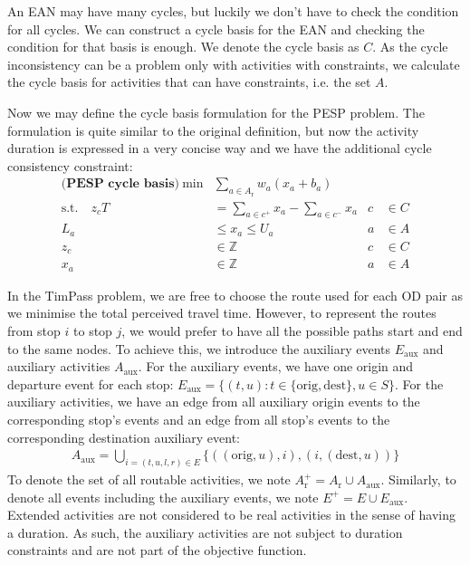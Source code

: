 \documentclass[english, 12pt, a4paper, sci, utf8, a-2b, online]{aaltothesis}
\newcommand{\Z}{\mathbb{Z}}
\newcommand{\Eaux}{E_\text{aux}}
\newcommand{\Ep}{E^+}
\newcommand{\Aaux}{A_\text{aux}}
\newcommand{\Ar}{A_\text{r}}
\newcommand{\Arp}{A_\text{r}^+}
\begin{document}
An EAN may have many cycles, but luckily we don't have to check the condition for all cycles. We can construct a cycle basis for the EAN and checking the condition for that basis is enough. We denote the cycle basis as $C$. As the cycle inconsistency can be a problem only with activities with constraints, we calculate the cycle basis for activities that can have constraints, i.e. the set $A$.



Now we may define the cycle basis formulation for the PESP problem. The formulation is quite similar to the original definition, but now the activity duration is expressed in a very concise way and we have the additional cycle consistency constraint:
\begin{align}
    \textbf{(PESP cycle basis)}\ \min &  \sum_{a \in \Ar} w_{a} (x_a + b_a) \\
    \textrm{s.t.} \quad  z_c T &= \sum_{a\in c^+} x_a - \sum_{a\in c^-} x_a &c &\in C \\
    L_a &\leq x_a  \leq U_a &a &\in A \\
    z_c &\in \Z &c& \in C \\
    x_a &\in \Z &a& \in A
\end{align}

In the TimPass problem, we are free to choose the route used for each OD pair as we minimise the total perceived travel time. However, to represent the routes from stop $i$ to stop $j$, we would prefer to have all the possible paths start and end to the same nodes. To achieve this, we introduce the auxiliary events $\Eaux$ and auxiliary activities $\Aaux$. For the auxiliary events, we have one origin and departure event for each stop: $\Eaux = \{(t, u) : t \in \{\text{orig}, \text{dest}\}, u \in S\}$. For the auxiliary activities, we have an edge from all auxiliary origin events to the corresponding stop's events and an edge from all stop's events to the corresponding destination auxiliary event:
\begin{align}
    \Aaux = \bigcup_{i = (t, u, l, r) \in E}\{((\text{orig}, u), i), (i, (\text{dest}, u))\}
\end{align}
To denote the set of all routable activities, we note $\Arp = \Ar \cup \Aaux$. Similarly, to denote all events including the auxiliary events, we note $\Ep = E \cup \Eaux$. Extended activities are not considered to be real activities in the sense of having a duration. As such, the auxiliary activities are not subject to duration constraints and are not part of the objective function.
\end{document}
